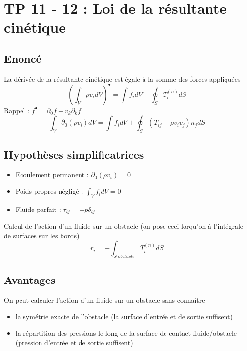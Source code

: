 
\section*{TP 11 - 12 : Loi de la résultante cinétique}
\subsection*{Enoncé}
La dérivée de la résultante cinétique est égale à la somme des forces appliquées
\begin{equation}
	\left( \int _V \rho v_i dV \right) ^\bullet = \int f_i dV + \oint  _S T_i^{(n)} dS
\end{equation}
Rappel : $f^\bullet = \partial _0 f + v_k \partial _k f$
\begin{equation}
	\int _V \partial _0 (\rho v_i) dV = \int f_i dV + \oint _S (T_{ij} - \rho v_i v_j )n_j dS
\end{equation}

\subsection*{Hypothèses simplificatrices}
\begin{itemize}
	\item Ecoulement permanent : $\partial _0 (\rho v_i) = 0$
	\item Poids propres négligé : $\int _V f_i dV = 0$
	\item Fluide parfait : $\tau _{ij} = -p \delta _{ij}$
\end{itemize}
Calcul de l'action d'un fluide sur un obstacle (on pose ceci lorqu'on à l'intégrale de surfaces sur les bords)
\begin{equation}
	r_i = - \int _{S \ obstacle} T_i ^{(n)} dS
\end{equation}

\subsection*{Avantages}
On peut calculer l'action d'un fluide sur un obstacle sans connaître 
\begin{itemize}
	\item la symétrie exacte de l'obstacle (la surface d'entrée et de sortie suffisent)
	\item la répartition des pressions le long de la surface de contact fluide/obstacle (pression d'entrée et de sortie suffisent)
\end{itemize}


